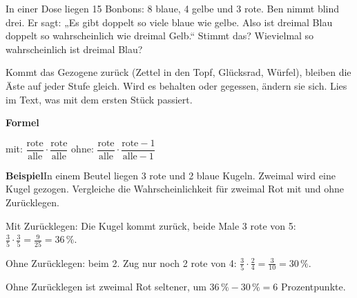 \documentclass[11pt]{article}
\makeatletter
\newcommand{\aufg}[3]{\par\noindent\makebox[0pt][r]{#3}\begin{minipage}[t]{\linewidth}#1\end{minipage}\par}
\newcommand{\nr}[1]{\makebox[7mm][l]{\textbf{#1}}}
\newlength{\kr}
\newcommand{\karomerk}[2]{\protected@write\@auxout{}{\string\karoseite{#1}{#2}{\thepage}}}
\newcommand{\karoseite}[3]{\expandafter\xdef\csname karo@#1@#2\endcsname{#3}}
\makeatother
\begin{document}
\aufg{\nr{4.}In einer Dose liegen 15 Bonbons: 8 blaue, 4 gelbe und 3 rote. Ben nimmt blind drei. Er sagt: „Es gibt doppelt so viele blaue wie gelbe. Also ist dreimal Blau doppelt so wahrscheinlich wie dreimal Gelb.“ Stimmt das? Wievielmal so wahrscheinlich ist dreimal Blau?}{}{{\scriptsize\color{mbgrau}Ziel\hspace{2mm}}}
\medskip
\par\vspace{3mm}\setlength{\kr}{\dimexpr\pagegoal-\pagetotal-10mm\relax}%
\ifdim\kr>12mm\karomerk{k}{C}\noindent{\scriptsize\color{mbgrau}Platz zum Rechnen}\par\nointerlineskip\vspace{1mm}\noindent
\begin{tikzpicture}\clip (0,0) rectangle ({\linewidth-0.5mm},\kr);\draw[black!16,line width=0.3pt,step=5mm] (0,0) grid (\linewidth,\kr);\end{tikzpicture}\fi\par
\clearpage\label{s:D}\noindent\colorbox{black!12}{}\hspace{3mm}{\Large\bfseries Mit oder ohne Zurücklegen?}\par\smallskip
\noindent Kommt das Gezogene zurück (Zettel in den Topf, Glücksrad, Würfel), bleiben die Äste auf jeder Stufe gleich. Wird es behalten oder gegessen, ändern sie sich. Lies im Text, was mit dem ersten Stück passiert.\par\medskip
\noindent\textbf{Formel}\par\nopagebreak\noindent\hspace*{4mm}\begin{minipage}{\dimexpr\linewidth-4mm\relax}mit: $\dfrac{\text{rote}}{\text{alle}} \cdot \dfrac{\text{rote}}{\text{alle}}$ \qquad ohne: $\dfrac{\text{rote}}{\text{alle}} \cdot \dfrac{\text{rote} - 1}{\text{alle} - 1}$\end{minipage}\par\medskip
\noindent\textbf{Beispiel}\quad In einem Beutel liegen 3 rote und 2 blaue Kugeln. Zweimal wird eine Kugel gezogen. Vergleiche die Wahrscheinlichkeit für zweimal Rot mit und ohne Zurücklegen.\par\smallskip
\noindent\par\noindent{}Mit Zurücklegen: Die Kugel kommt zurück, beide Male 3 rote von 5: $\frac{3}{5} \cdot \frac{3}{5} = \frac{9}{25} = 36\,\%$.\par\smallskip\par\noindent{}Ohne Zurücklegen: beim 2. Zug nur noch 2 rote von 4: $\frac{3}{5} \cdot \frac{2}{4} = \frac{3}{10} = 30\,\%$.\par\smallskip\par\noindent{}Ohne Zurücklegen ist zweimal Rot seltener, um $36\,\% - 30\,\% = 6$ Prozentpunkte.\par\smallskip\par\medskip
\end{document}

